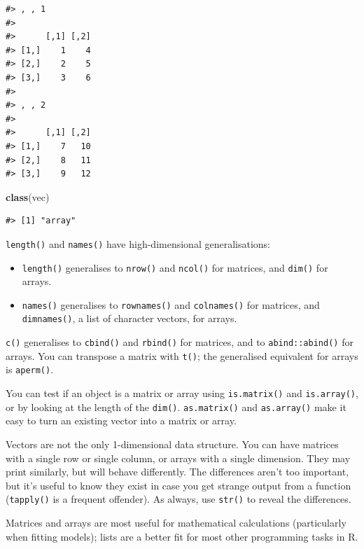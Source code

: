 \documentclass[]{book}
\newenvironment{Shaded}{\begin{snugshade}}{\end{snugshade}}
\newcommand{\KeywordTok}[1]{\textcolor[rgb]{0.13,0.29,0.53}{\textbf{#1}}}
\newcommand{\NormalTok}[1]{#1}
\theoremstyle{definition}
\theoremstyle{definition}
\theoremstyle{definition}
\theoremstyle{remark}
\begin{document}
\begin{verbatim}
#> , , 1
#> 
#>      [,1] [,2]
#> [1,]    1    4
#> [2,]    2    5
#> [3,]    3    6
#> 
#> , , 2
#> 
#>      [,1] [,2]
#> [1,]    7   10
#> [2,]    8   11
#> [3,]    9   12
\end{verbatim}

\begin{Shaded}
\begin{Highlighting}[]
\KeywordTok{class}\NormalTok{(vec)}
\end{Highlighting}
\end{Shaded}

\begin{verbatim}
#> [1] "array"
\end{verbatim}

\texttt{length()} and \texttt{names()} have high-dimensional
generalisations:

\begin{itemize}
\item
  \texttt{length()} generalises to \texttt{nrow()} and \texttt{ncol()}
  for matrices, and \texttt{dim()} for arrays.
\item
  \texttt{names()} generalises to \texttt{rownames()} and
  \texttt{colnames()} for matrices, and \texttt{dimnames()}, a list of
  character vectors, for arrays.
\end{itemize}

\texttt{c()} generalises to \texttt{cbind()} and \texttt{rbind()} for
matrices, and to \texttt{abind::abind()} for arrays. You can transpose a
matrix with \texttt{t()}; the generalised equivalent for arrays is
\texttt{aperm()}.

You can test if an object is a matrix or array using
\texttt{is.matrix()} and \texttt{is.array()}, or by looking at the
length of the \texttt{dim()}. \texttt{as.matrix()} and
\texttt{as.array()} make it easy to turn an existing vector into a
matrix or array.

Vectors are not the only 1-dimensional data structure. You can have
matrices with a single row or single column, or arrays with a single
dimension. They may print similarly, but will behave differently. The
differences aren't too important, but it's useful to know they exist in
case you get strange output from a function (\texttt{tapply()} is a
frequent offender). As always, use \texttt{str()} to reveal the
differences.

Matrices and arrays are most useful for mathematical calculations
(particularly when fitting models); lists are a better fit for most
other programming tasks in R.
\end{document}
